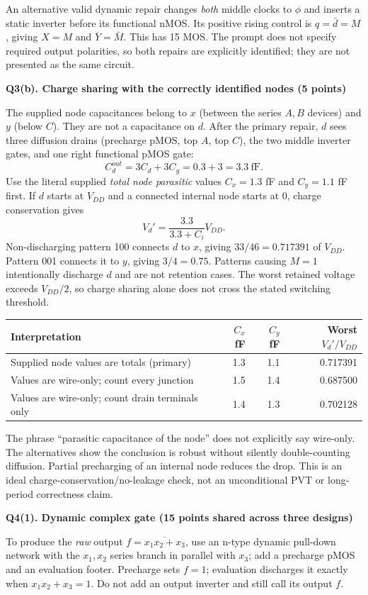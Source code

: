 \documentclass[10pt]{article}
\newcommand{\qheading}[1]{\par\medskip\textbf{#1}\par}
\begin{document}
An alternative valid dynamic repair changes \emph{both} middle clocks to $\phi$ and inserts a static inverter before its functional nMOS. Its positive rising control is $q=\bar d=M$, giving $X=M$ and $\overline Y=\bar M$. This has 15 MOS. The prompt does not specify required output polarities, so both repairs are explicitly identified; they are not presented as the same circuit.
\qheading{Q3(b). Charge sharing with the correctly identified nodes (5 points)}
The supplied node capacitances belong to $x$ (between the series $A,B$ devices) and $y$ (below $C$). They are not a capacitance on $d$. After the primary repair, $d$ sees three diffusion drains (precharge pMOS, top $A$, top $C$), the two middle inverter gates, and one right functional pMOS gate:
\[
C_d^{out}=3C_d+3C_g=0.3+3=3.3\ \mathrm{fF}.
\]
Use the literal supplied \emph{total node parasitic} values $C_x=1.3$ fF and $C_y=1.1$ fF first. If $d$ starts at $V_{DD}$ and a connected internal node starts at 0, charge conservation gives
\[
V_d'=\frac{3.3}{3.3+C_i}V_{DD}.
\]
Non-discharging pattern 100 connects $d$ to $x$, giving $33/46=0.717391$ of $V_{DD}$. Pattern 001 connects it to $y$, giving $3/4=0.75$. Patterns causing $M=1$ intentionally discharge $d$ and are not retention cases. The worst retained voltage exceeds $V_{DD}/2$, so charge sharing alone does not cross the stated switching threshold.
\begin{center}\begin{tabular}{lrrr}\toprule
Interpretation&$C_x$ fF&$C_y$ fF&Worst $V_d'/V_{DD}$\\\midrule
Supplied node values are totals (primary)&1.3&1.1&0.717391\\
Values are wire-only; count every junction&1.5&1.4&0.687500\\
Values are wire-only; count drain terminals only&1.4&1.3&0.702128\\\bottomrule
\end{tabular}\end{center}
The phrase ``parasitic capacitance of the node'' does not explicitly say wire-only. The alternatives show the conclusion is robust without silently double-counting diffusion. Partial precharging of an internal node reduces the drop. This is an ideal charge-conservation/no-leakage check, not an unconditional PVT or long-period correctness claim.
\newpage
\qheading{Q4(1). Dynamic complex gate (15 points shared across three designs)}
To produce the \emph{raw} output $f=\overline{x_1x_2+x_3}$, use an n-type dynamic pull-down network with the $x_1,x_2$ series branch in parallel with $x_3$; add a precharge pMOS and an evaluation footer. Precharge sets $f=1$; evaluation discharges it exactly when $x_1x_2+x_3=1$. Do not add an output inverter and still call its output $f$.
\end{document}
